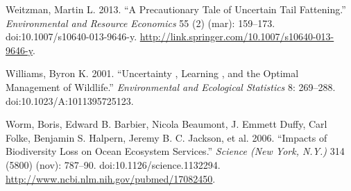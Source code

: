 \documentclass[author-year, review]{elsarticle} %
\begin{document}
Weitzman, Martin L. 2013. ``A Precautionary Tale of Uncertain Tail
Fattening.'' \emph{Environmental and Resource Economics} 55 (2) (mar):
159--173. doi:10.1007/s10640-013-9646-y.
\url{http://link.springer.com/10.1007/s10640-013-9646-y}.

Williams, Byron K. 2001. ``Uncertainty , Learning , and the Optimal
Management of Wildlife.'' \emph{Environmental and Ecological Statistics}
8: 269--288. doi:10.1023/A:1011395725123.

Worm, Boris, Edward B. Barbier, Nicola Beaumont, J. Emmett Duffy, Carl
Folke, Benjamin S. Halpern, Jeremy B. C. Jackson, et al. 2006. ``Impacts
of Biodiversity Loss on Ocean Ecosystem Services.'' \emph{Science (New
York, N.Y.)} 314 (5800) (nov): 787--90. doi:10.1126/science.1132294.
\url{http://www.ncbi.nlm.nih.gov/pubmed/17082450}.
\end{document}
